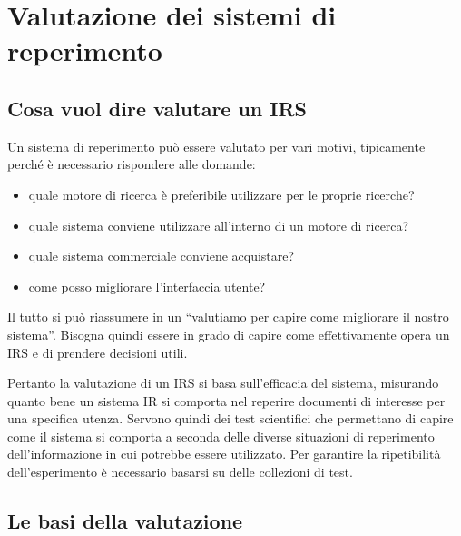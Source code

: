 
\chapter{Valutazione dei sistemi di reperimento}

\section{Cosa vuol dire valutare un IRS}

Un sistema di reperimento può essere valutato per vari motivi, tipicamente perché è necessario rispondere alle domande:

\begin{itemize}
	\item quale motore di ricerca è preferibile utilizzare per le proprie ricerche?
	\item quale sistema conviene utilizzare all'interno di un motore di ricerca?
	\item quale sistema commerciale conviene acquistare?
	\item come posso migliorare l'interfaccia utente?
\end{itemize}

\noindent Il tutto si può riassumere in un ``valutiamo per capire come migliorare il nostro sistema''. Bisogna quindi essere in grado di capire come effettivamente opera un IRS e di prendere decisioni utili.

Pertanto la valutazione di un IRS si basa sull'efficacia del sistema, misurando quanto bene un sistema IR si comporta nel reperire documenti di interesse per una specifica utenza.
Servono quindi dei test scientifici che permettano di capire come il sistema si comporta a seconda delle diverse situazioni di reperimento dell'informazione in cui potrebbe essere utilizzato. Per garantire la ripetibilità dell'esperimento è necessario basarsi su delle collezioni di test.

\section{Le basi della valutazione}

